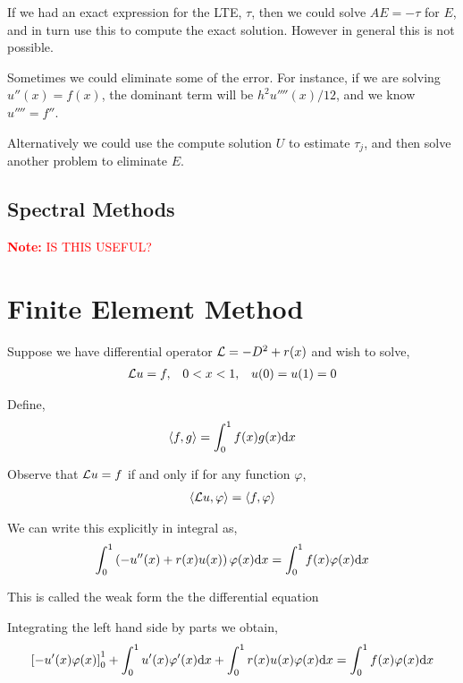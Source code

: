 \documentclass[12pt]{article}
\newcommand{\note}[1]{\textcolor{red}{\textbf{Note:} #1}}
\begin{document}
If we had an exact expression for the LTE, \( \tau \), then we could solve \( AE = -\tau \) for \( E \), and in turn use this to compute the exact solution. However in general this is not possible.

Sometimes we could eliminate some of the error. For instance, if we are solving \( u''(x) = f(x) \), the dominant term will be \( h^2u''''(x)/12 \), and we know \( u''''=f'' \).

Alternatively we could use the compute solution \( U \) to estimate \( \tau_j \), and then solve another problem to eliminate \( E \).

\subsection{Spectral Methods}

\note{IS THIS USEFUL?}

\section{Finite Element Method}

Suppose we have differential operator \( \mathcal{L} = -D^2 + r(x) \) and wish to solve,
\begin{align*}
    \mathcal{L} u = f, && 0<x<1, && u(0) = u(1) = 0
\end{align*}

Define,
\begin{align*}
    \left\langle f,g \right\rangle= \int_0^1 f(x)g(x)\mathrm{d} x
\end{align*}

Observe that \( \mathcal{L} u = f \) if and only if for any function \( \varphi \),
\begin{align*}
    \left\langle \mathcal{L} u, \varphi \right\rangle = \left\langle f,\varphi \right\rangle
\end{align*}

We can write this explicitly in integral as,
\begin{align*}
    \int_0^1 \left(-u''(x) + r(x)u(x)\right)\varphi(x) \mathrm{d} x = \int_0^1 f(x)\varphi(x)\mathrm{d} x
\end{align*}

This is called the weak form the the differential equation

Integrating the left hand side by parts we obtain,
\begin{align*}
    \left[ -u'(x)\varphi(x) \right]_0^1 + \int_0^1 u'(x)\varphi'(x)\mathrm{d} x + \int_0^1 r(x)u(x)\varphi(x)\mathrm{d} x= \int_0^1 f(x)\varphi(x)\mathrm{d} x
\end{align*}
\end{document}
